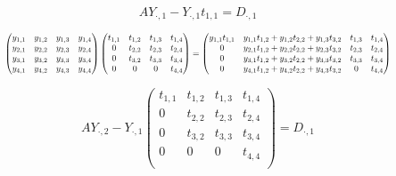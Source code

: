 \documentclass[]{article}
\begin{document}
\begin{equation}
	AY_{\cdot,1}-Y_{\cdot,1}t_{1,1}=D_{\cdot,1}
\end{equation}



\begin{equation}
\resizebox{.9\hsize}{!}{$
	\begin{pmatrix}
	y_{1,1} & y_{1,2} & y_{1,3}  & y_{1,4} \\
	y_{2,1} & y_{2,2} & y_{2,3}  & y_{2,4} \\
	y_{3,1} & y_{3,2} & y_{3,3}  & y_{3,4} \\
	y_{4,1} & y_{4,2} & y_{4,3}  & y_{4,4} \\
	\end{pmatrix}
	\begin{pmatrix}
	t_{1,1} & t_{1,2} & t_{1,3}  & t_{1,4} \\
	0 & t_{2,2} & t_{2,3}  & t_{2,4} \\
	0 & t_{3,2} & t_{3,3}  & t_{3,4} \\
	0 & 0 & 0  & t_{4,4} \\
	\end{pmatrix}
	=
	\begin{pmatrix}
	y_{1,1}t_{1,1} & y_{1,1}t_{1,2}+ y_{1,2}t_{2,2} + y_{1,3}t_{3,2}& t_{1,3}  & t_{1,4} \\
	0 & y_{2,1}t_{1,2}+ y_{2,2}t_{2,2} + y_{2,3}t_{3,2} & t_{2,3}  & t_{2,4} \\
	0 & y_{3,1}t_{1,2}+ y_{3,2}t_{2,2} + y_{3,3}t_{3,2} & t_{3,3}  & t_{3,4} \\
	0 & y_{4,1}t_{1,2}+ y_{4,2}t_{2,2} + y_{4,3}t_{3,2} & 0  & t_{4,4} \\
	\end{pmatrix}
	$}
\end{equation}


\begin{equation}
AY_{\cdot,2}-Y_{\cdot,1}
\begin{pmatrix}
t_{1,1} & t_{1,2} & t_{1,3}  & t_{1,4} \\
0 & t_{2,2} & t_{2,3}  & t_{2,4} \\
0 & t_{3,2} & t_{3,3}  & t_{3,4} \\
0 & 0 & 0  & t_{4,4} \\
\end{pmatrix}
=
D_{\cdot,1}
\end{equation}
\end{document}
